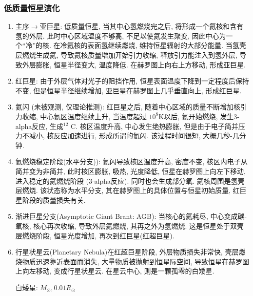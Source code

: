 \subsubsection{低质量恒星演化}
\begin{enumerate}\small
    \item 主序$\rightarrow$亚巨星: 低质量恒星, 当其中心氢燃烧完之后, 将形成一个氦核和含有氢的外层. 此时中心区域温度不够高, 不足以使氦发生聚变, 因此中心为一个“冷”的核. 在冷氦核的表面氢继续燃烧, 维持恒星辐射的大部分能量. 当氢壳层燃烧生成氦, 导致氦核质量增加开始引力收缩, 释放引力能注入到氢外层, 导致外层膨胀, 恒星半径变大, 温度降低. 在赫罗图上向右上方移动, 形成亚巨星. 
    \item 红巨星: 由于外层气体对光子的阻挡作用, 恒星表面温度下降到一定程度后保持不变, 但是恒星半径继续增加, 亚巨星在赫罗图上几乎垂直向上, 形成红巨星. 
    \item 氦闪 (未被观测, 仅理论推测): 红巨星之后, 随着中心区域的质量不断增加核引力收缩, 中心氦区温度继续上升, 当温度超过 $10^8$K以后, 氦开始燃烧, 发生3-alpha反应, 生成${}^12$ C. 核区温度升高, 中心发生绝热膨胀, 但是由于电子简并压力不减小, 核反应加速进行, 形成所谓的氦闪. 该过程时间很短, 大概几秒-几分钟. 
    \item 氦燃烧稳定阶段(水平分支)): 氦闪导致核区温度升高, 密度不变, 核区内电子从简并变为非简并, 此时核区膨胀, 吸热, 光度降低, 恒星在赫罗图上向左下移动, 进入稳定的氦燃烧阶段 (3-alpha反应). 同时也会生成部分氧. 
    \subitem 氦核周围是氢壳层燃烧. 该状态称为水平分支, 其在赫罗图上的具体位置与恒星初始质量, 红巨星阶段的质量损失有关. 
    \item 渐进巨星分支(Asymptotic Giant Brant: AGB): 当核心的氦耗尽, 中心变成碳-氧核, 核心再次收缩, 导致外层氦燃烧, 其再之外为氢燃烧. 这是恒星处于双壳层燃烧阶段, 恒星光度增加, 再次到红巨星(红超巨星). 
    \item 行星状星云(Planetary Nebula)在红超巨星阶段, 外层物质损失非常快, 壳层燃烧物质迅速靠近表面而消失,  大量物质被抛射到恒星际空间, 导致恒星在赫罗图上向左移动, 变成行星状星云. 在星云中心, 则是一颗孤零的白矮星. 
    
    白矮星: $M_{\odot}, 0.01R_{\odot}$
\end{enumerate}

